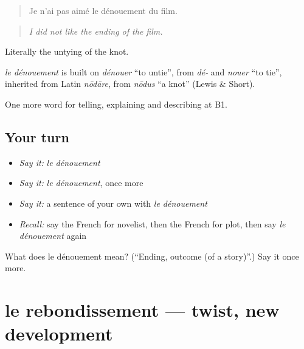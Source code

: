 \begin{quote}
Je n'ai pas aimé le dénouement du film.
\end{quote}

\begin{quote}
\emph{I did not like the ending of the film.}
\end{quote}

Literally the untying of the knot.

\begin{cousinweb}
\emph{le dénouement} is built on \emph{dénouer} \textquotedblleft{}to untie\textquotedblright{}, from \emph{dé-} and \emph{nouer} \textquotedblleft{}to tie\textquotedblright{}, inherited from Latin \emph{nōdāre}, from \emph{nōdus} \textquotedblleft{}a knot\textquotedblright{} (Lewis \& Short).
\end{cousinweb}

\begin{grammarlens}[title={What you've built}]
One more word for telling, explaining and describing at B1.
\end{grammarlens}

\subsection*{Your turn}
\begin{itemize}
\raggedright
  \item \emph{Say it:} \emph{le dénouement}
  \item \emph{Say it:} \emph{le dénouement}, once more
  \item \emph{Say it:} a sentence of your own with \emph{le dénouement}
  \item \emph{Recall:} say the French for novelist, then the French for plot, then say \emph{le dénouement} again
\end{itemize}

\begin{tcolorbox}[breakable,colback=teal!4,colframe=teal!35!black,title={Before you move on}]
What does le dénouement mean? (\textquotedblleft{}Ending, outcome (of a story)\textquotedblright{}.) Say it once more.
\end{tcolorbox}
\section[le rebondissement]{le rebondissement — twist, new development}

\label{lesson:FR-C519-rebondissement}



